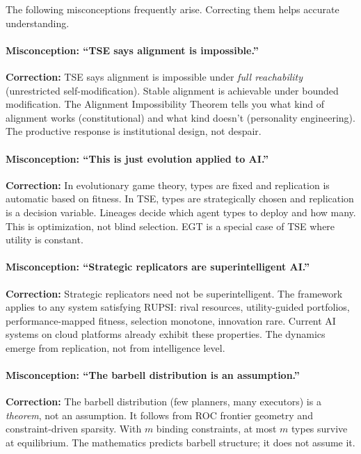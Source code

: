 \documentclass[12pt]{article}
\begin{document}
The following misconceptions frequently arise. Correcting them helps accurate understanding.

\paragraph{Misconception: ``TSE says alignment is impossible.''} \textbf{Correction:} TSE says alignment is impossible under \emph{full reachability} (unrestricted self-modification). Stable alignment is achievable under bounded modification. The Alignment Impossibility Theorem tells you what kind of alignment works (constitutional) and what kind doesn't (personality engineering). The productive response is institutional design, not despair.

\paragraph{Misconception: ``This is just evolution applied to AI.''} \textbf{Correction:} In evolutionary game theory, types are fixed and replication is automatic based on fitness. In TSE, types are strategically chosen and replication is a decision variable. Lineages decide which agent types to deploy and how many. This is optimization, not blind selection. EGT is a special case of TSE where utility is constant.

\paragraph{Misconception: ``Strategic replicators are superintelligent AI.''} \textbf{Correction:} Strategic replicators need not be superintelligent. The framework applies to any system satisfying RUPSI: rival resources, utility-guided portfolios, performance-mapped fitness, selection monotone, innovation rare. Current AI systems on cloud platforms already exhibit these properties. The dynamics emerge from replication, not from intelligence level.

\paragraph{Misconception: ``The barbell distribution is an assumption.''} \textbf{Correction:} The barbell distribution (few planners, many executors) is a \emph{theorem}, not an assumption. It follows from ROC frontier geometry and constraint-driven sparsity. With $m$ binding constraints, at most $m$ types survive at equilibrium. The mathematics predicts barbell structure; it does not assume it.
\end{document}
